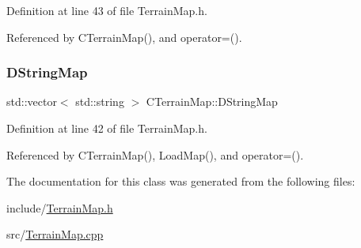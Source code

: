 Definition at line 43 of file Terrain\+Map.\+h.



Referenced by C\+Terrain\+Map(), and operator=().

\hypertarget{classCTerrainMap_a76db5fd05e22e0aea413f49175f9c282}{}\label{classCTerrainMap_a76db5fd05e22e0aea413f49175f9c282} 
\subsubsection{\texorpdfstring{D\+String\+Map}{DStringMap}}
{\footnotesize\ttfamily std\+::vector$<$ std\+::string $>$ C\+Terrain\+Map\+::\+D\+String\+Map\hspace{0.3cm}{\ttfamily [protected]}}



Definition at line 42 of file Terrain\+Map.\+h.



Referenced by C\+Terrain\+Map(), Load\+Map(), and operator=().



The documentation for this class was generated from the following files\+:\begin{DoxyCompactItemize}
\item 
include/\hyperlink{TerrainMap_8h}{Terrain\+Map.\+h}\item 
src/\hyperlink{TerrainMap_8cpp}{Terrain\+Map.\+cpp}\end{DoxyCompactItemize}
